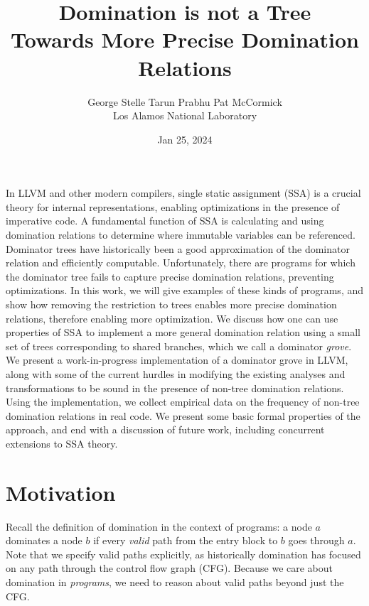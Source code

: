 \documentclass[a4paper,twocolumn]{article}
\title{Domination is not a Tree \\
\Large{Towards More Precise Domination Relations}}
\date{Jan 25, 2024}
\author{George Stelle \; Tarun Prabhu \; Pat McCormick \\ Los Alamos National Laboratory}
\begin{document}
\maketitle

In LLVM and other modern compilers, single static assignment (SSA) is a crucial
theory for internal representations, enabling optimizations in the presence of
imperative code. A fundamental function of SSA is calculating and using
domination relations to determine where immutable variables can be referenced.
Dominator trees have historically been a good approximation of the dominator
relation and efficiently computable. Unfortunately, there are programs for
which the dominator tree fails to capture precise domination relations,
preventing optimizations. In this work, we will give examples of these kinds of
programs, and show how removing the restriction to trees enables more precise
domination relations, therefore enabling more optimization. We discuss how one
can use properties of SSA to implement a more general domination relation using
a small set of trees corresponding to shared branches, which we call a
dominator \emph{grove}. We present a work-in-progress implementation of a
dominator grove in LLVM, along with some of the current hurdles in modifying
the existing analyses and transformations to be sound in the presence of
non-tree domination relations. Using the implementation, we collect empirical
data on the frequency of non-tree domination relations in real code. We present
some basic formal properties of the approach, and end with a discussion of
future work, including concurrent extensions to SSA theory.  

\section*{Motivation}
Recall the definition of domination in the context of programs: a node $a$
dominates a node $b$ if every \emph{valid} path from the entry block to $b$ goes
through $a$. Note that we specify valid paths explicitly, as historically
domination has focused on any path through the control flow graph (CFG).
Because we care about domination in \emph{programs}, we need to reason about
valid paths beyond just the CFG. 
\end{document}
